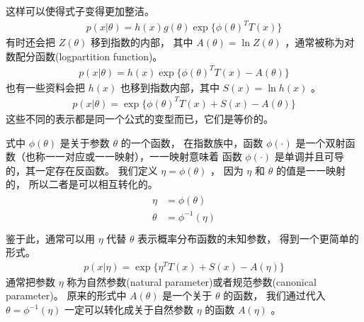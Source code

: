 \documentclass[letterpaper,10pt,english]{sphinxmanual}
\begin{document}
这样可以使得式子变得更加整洁。
\begin{equation}\label{equation:指数族/content:eq_24_03}
\begin{split}p(x|\theta) = h(x) g(\theta) \exp \{\phi(\theta)^T T(x)  \}\end{split}
\end{equation}
有时还会把 \(Z(\theta)\) 移到指数的内部，
其中 \(A(\theta) = \ln Z(\theta)\) ，通常被称为对数配分函数(log\sphinxhyphen{}partition function)。
\begin{equation}\label{equation:指数族/content:eq_24_04}
\begin{split} p(x|\theta) = h(x) \exp \{\phi(\theta)^T T(x) - A(\theta) \}\end{split}
\end{equation}
也有一些资料会把 \(h(x)\) 也移到指数内部，其中 \(S(x)=\ln h(x)\) 。
\begin{equation}\label{equation:指数族/content:eq_24_05}
\begin{split}p(x|\theta) =  \exp \{\phi(\theta)^T T(x) + S(x) - A(\theta) \}\end{split}
\end{equation}
这些不同的表示都是同一个公式的变型而已，它们是等价的。


式中 \(\phi(\theta)\) 是关于参数 \(\theta\) 的一个函数，
在指数族中，函数 \(\phi(\cdot)\) 是一个双射函数（也称一一对应或一一映射），一一映射意味着
函数 \(\phi(\cdot)\) 是单调并且可导的，其一定存在反函数。
我们定义 \(\eta=\phi(\theta)\) ，
因为 \(\eta\) 和 \(\theta\) 的值是一一映射的，
所以二者是可以相互转化的。
\begin{align}\label{equation:指数族/content:指数族/content:0}\!\begin{aligned}
\eta &= \phi(\theta)\\
\theta &= \phi^{-1} (\eta)\\
\end{aligned}\end{align}
鉴于此，通常可以用 \(\eta\) 代替 \(\theta\) 表示概率分布函数的未知参数，
得到一个更简单的形式。
\begin{equation}\label{equation:指数族/content:eq_24_06}
\begin{split}p(x|\eta) =  \exp \{ \eta^T T(x) + S(x) - A(\eta) \}\end{split}
\end{equation}
通常把参数 \(\eta\) 称为自然参数(natural parameter)或者规范参数(canonical parameter)。
原来的形式中 \(A(\theta)\) 是一个关于 \(\theta\) 的函数，
我们通过代入 \(\theta = \phi^{-1} (\eta)\) 一定可以转化成关于自然参数 \(\eta\)
的函数 \(A(\eta)\) 。
\end{document}
